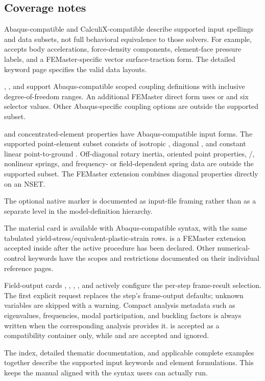 \subsection{Coverage notes}

Abaqus-compatible and CalculiX-compatible describe supported
input spellings and data subsets, not full behavioral equivalence to
those solvers. For example,  accepts body accelerations,
force-density components, element-face pressure labels, and a
FEMaster-specific vector surface-traction form. The detailed
keyword page specifies the valid data layouts.

, , and 
support Abaqus-compatible scoped coupling definitions with
inclusive degree-of-freedom ranges. An additional FEMaster
direct form uses  or 
and six selector values. Other Abaqus-specific coupling options
are outside the supported subset.

 and concentrated-element properties have
Abaqus-compatible input forms. The supported point-element
subset consists of isotropic , diagonal ,
and constant linear point-to-ground . Off-diagonal
rotary inertia, oriented point properties, /,
nonlinear springs, and frequency- or field-dependent spring data
are outside the supported subset. The FEMaster extension
 combines diagonal properties directly on an NSET.

The optional native  marker is documented as input-file framing rather than as a separate level in the model-definition hierarchy.

The  material card is available with Abaqus-compatible syntax, with the same tabulated yield-stress/equivalent-plastic-strain rows.  is a FEMaster extension accepted inside
 after the active procedure has been declared.
Other numerical-control keywords have the scopes and restrictions
documented on their individual reference pages.

Field-output cards , , , , and  actively configure the per-step frame-result selection. The first explicit request replaces the step's frame-output defaults; unknown variables are skipped with a warning. Compact analysis metadata such as eigenvalues, frequencies, modal participation, and buckling factors is always written when the corresponding analysis provides it.  is accepted as a compatibility container only, while  and  are accepted and ignored.

The index, detailed thematic documentation, and applicable complete examples together describe the supported input keywords and element formulations. This keeps the manual aligned with the syntax users can actually run.
